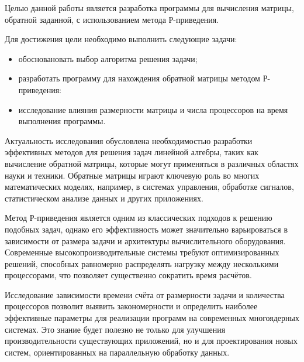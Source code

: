\Introduction


Целью данной работы является разработка программы для вычисления матрицы, обратной заданной, с использованием метода Р-приведения.

Для достижения цели необходимо выполнить следующие задачи:
\begin{itemize}
    \item обосновановать выбор алгоритма решения задачи;
    \item разработать программу для нахождения обратной матрицы методом Р-приведения:
    \item исследование влияния размерности матрицы и числа процессоров на время выполнения программы.
\end{itemize}


Актуальность исследования обусловлена необходимостью разработки эффективных методов для решения задач линейной алгебры, таких как вычисление обратной матрицы, которые могут применяться в различных областях науки и техники.
Обратные матрицы играют ключевую роль во многих математических моделях, например, в системах управления, обработке сигналов, статистическом анализе данных и других приложениях.

Метод Р-приведения является одним из классических подходов к решению подобных задач, однако его эффективность может значительно варьироваться в зависимости от размера задачи и архитектуры вычислительного оборудования.
Современные высокопроизводительные системы требуют оптимизированных решений, способных равномерно распределять нагрузку между несколькими процессорами, что позволяет существенно сократить время расчётов.

Исследование зависимости времени счёта от размерности задачи и количества процессоров позволит выявить закономерности и определить наиболее эффективные параметры для реализации программ на современных многоядерных системах.
Это знание будет полезно не только для улучшения производительности существующих приложений, но и для проектирования новых систем, ориентированных на параллельную обработку данных.


